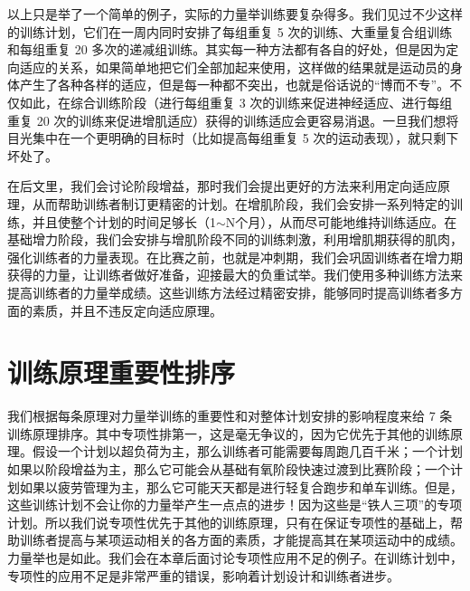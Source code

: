 \documentclass[fontset=fandol, a4paper, 12pt, openright]{ctexbook}
\begin{document}
以上只是举了一个简单的例子，实际的力量举训练要复杂得多。我们见过不少这样的训练计划，它们在一周内同时安排了每组重复 5 次的训练、大重量复合组训练和每组重复 20 多次的递减组训练。其实每一种方法都有各自的好处，但是因为定向适应的关系，如果简单地把它们全部加起来使用，这样做的结果就是运动员的身体产生了各种各样的适应，但是每一种都不突出，也就是俗话说的“博而不专”。不仅如此，在综合训练阶段（进行每组重复 3 次的训练来促进神经适应、进行每组重复 20 次的训练来促进增肌适应）获得的训练适应会更容易消退。一旦我们想将目光集中在一个更明确的目标时（比如提高每组重复 5 次的运动表现），就只剩下坏处了。

在后文里，我们会讨论阶段增益，那时我们会提出更好的方法来利用定向适应原理，从而帮助训练者制订更精密的计划。在增肌阶段，我们会安排一系列特定的训练，并且使整个计划的时间足够长（1$\sim$N个月），从而尽可能地维持训练适应。在基础增力阶段，我们会安排与增肌阶段不同的训练刺激，利用增肌期获得的肌肉，强化训练者的力量表现。在比赛之前，也就是冲刺期，我们会巩固训练者在增力期获得的力量，让训练者做好准备，迎接最大的负重试举。我们使用多种训练方法来提高训练者的力量举成绩。这些训练方法经过精密安排，能够同时提高训练者多方面的素质，并且不违反定向适应原理。

\section{训练原理重要性排序}

我们根据每条原理对力量举训练的重要性和对整体计划安排的影响程度来给 7 条训练原理排序。其中专项性排第一，这是毫无争议的，因为它优先于其他的训练原理。假设一个计划以超负荷为主，那么训练者可能需要每周跑几百千米；一个计划如果以阶段增益为主，那么它可能会从基础有氧阶段快速过渡到比赛阶段；一个计划如果以疲劳管理为主，那么它可能天天都是进行轻复合跑步和单车训练。但是，这些训练计划不会让你的力量举产生一点点的进步！因为这些是“铁人三项”的专项计划。所以我们说专项性优先于其他的训练原理，只有在保证专项性的基础上，帮助训练者提高与某项运动相关的各方面的素质，才能提高其在某项运动中的成绩。力量举也是如此。我们会在本章后面讨论专项性应用不足的例子。在训练计划中，专项性的应用不足是非常严重的错误，影响着计划设计和训练者进步。
\end{document}
